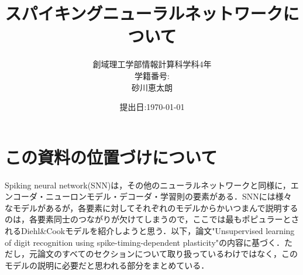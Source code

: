 \documentclass[a4paper, titlepage]{jsarticle}
\title{\Huge スパイキングニューラルネットワークについて}
\author{\Large 創域理工学部\quad 情報計算科学科\quad 4年\\\Large 学籍番号\;:\;6322045\\\Large 砂川恵太朗}
\date{提出日\;:\;\today}
\begin{document}
\maketitle

\section{この資料の位置づけについて}
Spiking neural network(SNN)は，その他のニューラルネットワークと同様に，エンコーダ・ニューロンモデル・デコーダ・学習則の要素がある．SNNには様々なモデルがあるが，各要素に対してそれぞれのモデルからかいつまんで説明するのは，各要素同士のつながりが欠けてしまうので，ここでは最もポピュラーとされるDiehl\&Cookモデルを紹介しようと思う．以下，論文"Unsupervised learning of digit recognition using spike-timing-dependent plasticity"の内容に基づく．ただし，元論文のすべてのセクションについて取り扱っているわけではなく，このモデルの説明に必要だと思われる部分をまとめている．
\end{document}

